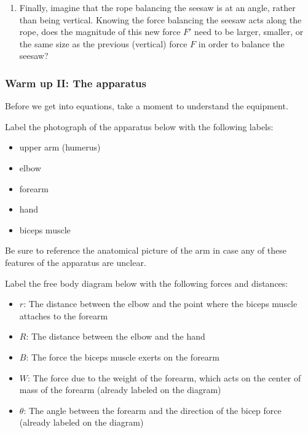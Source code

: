 \documentclass[11pt,letterpaper]{article}
\begin{document}
\begin{enumerate}[label={\arabic*.},ref=\textcolor{black}{\arabic*}]
\item \label{q:angle-rope}
	Finally, imagine that the rope balancing the seesaw
	is at an angle, rather than being vertical.
	Knowing the force balancing the seesaw acts along the rope,
	does the magnitude of this new force $F'$ need to be 
	larger, smaller, or the same size as the previous (vertical) force $F$
	in order to balance the seesaw?

	\end{enumerate}

\subsubsection*{Warm up II: The apparatus}
Before we get into equations, take a moment to understand the equipment.  
\enumb
\item
	Label the photograph of the apparatus below with the following labels:

\begin{itemize}
	\item upper arm (humerus)
	\item elbow 
	\item forearm 
	\item hand
	\item biceps muscle
\end{itemize}
	Be sure to reference the anatomical picture of the arm in case
	any of these features of the apparatus are unclear.
\item
	Label the free body diagram below with the following forces and distances:
\begin{itemize}
	\item $r$:  The distance between the elbow 
		and the point where the biceps muscle attaches to the forearm
	\item $R$:	The distance between the elbow and the hand
	\item $B$:	The force the biceps muscle exerts on the forearm
	\item $W$:  The force due to the weight of the forearm,
		which acts on the center of mass of the forearm
		(already labeled on the diagram)
	\item $\theta$:  The angle between the forearm 
		and the direction of the bicep force
		(already labeled on the diagram)
\end{itemize}
\end{document}
